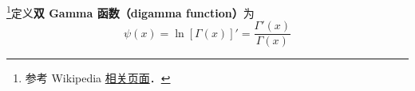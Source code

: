 
\begin{issues}
\issueDraft
\end{issues}

\footnote{参考 Wikipedia \href{https://en.wikipedia.org/wiki/Digamma_function}{相关页面}．}定义\textbf{双 Gamma 函数（digamma function）}为
\begin{equation}
\psi(x) = \ln[\Gamma(x)]' = \frac{\Gamma'(x)}{\Gamma(x)}
\end{equation}

